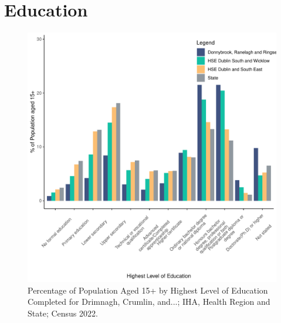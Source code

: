 \documentclass{article}
\begin{document}
\section{Education}\label{sect:Edu}
\begin{figure}[H]
	\centering
	\includegraphics[width = 120mm]{../figures/EduED.pdf}
	\caption{Percentage of Population Aged 15+ by Highest Level of Education Completed for Drimnagh, Crumlin, and...; IHA, Health Region and State; Census 2022.}
	\label{fig:vbnv}
	\end{figure}
\end{document}

